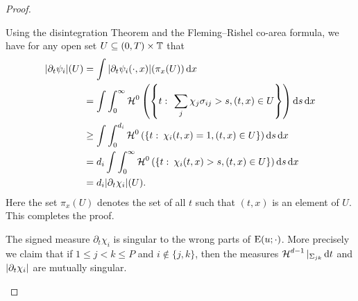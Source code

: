 \begin{proof}
\begin{description}[wide=0pt]
		Using the disintegration Theorem 
		\cite[Thm.~3.103]{ambrosio_fusco_pallara_functions_of_bv_and_free_discontinuity_problems}
		 and the Fleming--Rishel co-area formula, we have for any open set 
		$ U \subseteq ( 0 , T ) \times \operatorname{\mathbb{T}} $ that
		\begin{align*}
			\abs{
				\partial_{ t } \psi_{ i }
			} ( U ) 
			& =
			\int
			\abs{ 
				\partial_{ t } \psi_{ i } ( \cdot , x )
			} ( \pi_{ x } ( U ) ) 
			\dd{ x }
			\\
			& =
			\int
			\int_{ 0 }^{ \infty }
			\operatorname{\mathcal{H}}^{ 0 } \left(
			\left\{
			t 
			\, \colon \,
			\sum_{ j } \chi_{ j } \sigma_{ i j } > s,
			( t, x ) \in U
			\right\}
			\right)
			\dd{ s }
			\dd{ x }
			\\
			& \geq
			\int
			\int_{ 0 }^{ d_{ i } }
			\operatorname{\mathcal{H}}^{ 0 }
			\left(
			\left\{
			t 
			\, \colon \,
			\chi_{ i } ( t , x ) = 1,
			( t, x ) \in U
			\right\}
			\right)
			\dd{ s }
			\dd{ x }
			\\
			& =
			d_{ i }
			\int
			\int_{ 0 }^{ \infty }
			\operatorname{\mathcal{H}}^{ 0 } \left(
			\left\{
			t 
			\, \colon \,
			\chi_{ i } ( t , x ) > s , ( t , x ) \in U
			\right\}
			\right)
			\dd{ s }
			\dd{ x }
			\\
			& =
			d_{ i }
			\abs{ \partial_{ t } \chi_{ i } } ( U ).
		\end{align*}
		Here the set $ \pi_{ x } ( U ) $ denotes the set of all $ t $ such that 
		$ ( t , x ) $ is an element of $ U $. This completes the proof.
		
		\item[Step 3:] The signed measure $ \partial_{ t } \chi_{ i } $ is 
		singular to the wrong parts of $ \operatorname{E} ( u ; \cdot ) $. More 
		precisely we claim that if $ 1 \leq j < k \leq P $ and $ i \notin \{ j 
		, k \} $, then the measures 
		$ \operatorname{\mathcal{H}}^{ d - 1 } |_{ \Sigma_{ j k } } \dd{ t } $ and $ \abs{ \partial_{ 
				t } \chi_{ i } } $ are mutually singular.
		

\end{description}
\end{proof}
